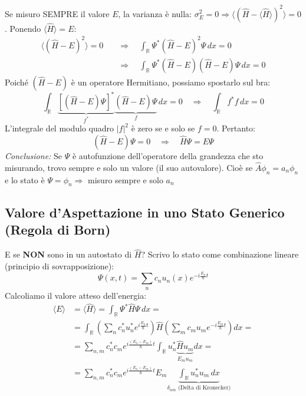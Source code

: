 \documentclass[11pt, a4paper]{article}
\begin{document}
Se misuro SEMPRE il valore $E$, la varianza è nulla: $\sigma_E^2 = 0 \Rightarrow \langle (\hat{H} - \langle \hat{H} \rangle)^2 \rangle = 0$. Ponendo $\langle \hat{H} \rangle = E$: %
\begin{align*}
    \langle (\hat{H} - E)^2 \rangle = 0 \quad &\Rightarrow \quad \int_{\mathbb{R}} \Psi^* (\hat{H} - E)^2 \Psi \, dx = 0 \\ %
    &\Rightarrow \quad \int_{\mathbb{R}} \Psi^* (\hat{H} - E) (\hat{H} - E) \Psi \, dx = 0 %
\end{align*}
Poiché $(\hat{H} - E)$ è un operatore Hermitiano, possiamo spostarlo sul bra: %
\begin{equation*}
    \int_{\mathbb{R}} \underbrace{ [(\hat{H} - E) \Psi]^* }_{f^*} \underbrace{ (\hat{H} - E) \Psi }_{f} \, dx = 0 \quad \Rightarrow \quad \int_{\mathbb{R}} f^* f \, dx = 0 %
\end{equation*}
L'integrale del modulo quadro $|f|^2$ è zero se e solo se $f = 0$. Pertanto: %
\begin{equation}
    (\hat{H} - E) \Psi = 0 \quad \Rightarrow \quad \boxed{ \hat{H}\Psi = E\Psi } %
\end{equation}
\textit{Conclusione:} Se $\Psi$ è autofunzione dell'operatore della grandezza che sto misurando, trovo sempre e solo un valore (il suo autovalore). Cioè se $\hat{A}\phi_n = a_n\phi_n$ e lo stato è $\Psi = \phi_n \Rightarrow$ misuro sempre e solo $a_n$ %

\subsection{Valore d'Aspettazione in uno Stato Generico (Regola di Born)} %

E se \textbf{NON} sono in un autostato di $\hat{H}$? %
Scrivo lo stato come combinazione lineare (principio di sovrapposizione): %
\begin{equation*}
    \Psi(x,t) = \sum_n c_n u_n(x) e^{-i\frac{E_n}{\hbar}t} %
\end{equation*}
Calcoliamo il valore atteso dell'energia: %
\begin{align*}
    \langle E \rangle &= \langle \hat{H} \rangle = \int_{\mathbb{R}} \Psi^* \hat{H} \Psi \, dx = \\ %
    &= \int_{\mathbb{R}} \left( \sum_n c_n^* u_n^* e^{i\frac{E_n}{\hbar}t} \right) \hat{H} \left( \sum_m c_m u_m e^{-i\frac{E_m}{\hbar}t} \right) dx = \\ %
    &= \sum_{n,m} c_n^* c_m e^{i\frac{(E_n - E_m)}{\hbar}t} \int_{\mathbb{R}} u_n^* \underbrace{ \hat{H} u_m }_{E_m u_m} dx = \\ %
    &= \sum_{n,m} c_n^* c_m e^{i\frac{(E_n - E_m)}{\hbar}t} E_m \underbrace{ \int_{\mathbb{R}} u_n^* u_m \, dx }_{\delta_{nm} \text{ (Delta di Kronecker)}} %
\end{align*}
\end{document}
